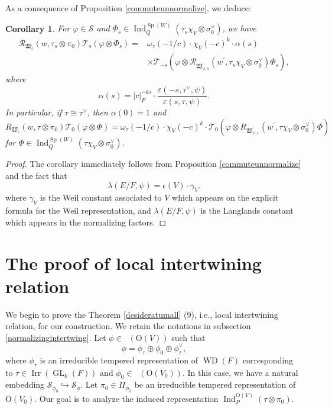 \documentclass[article]{article}
\numberwithin{equation}{section}
\newtheorem{corollary}[theorem]{Corollary}
\theoremstyle{definition}
\DeclareMathOperator{\WD}{WD}
\DeclareMathOperator{\Ind}{Ind}
\DeclareMathOperator{\GL}{GL}
\DeclareMathOperator{\SP}{Sp}
\DeclareMathOperator{\Irr}{Irr}
\DeclareMathOperator{\Para}{\Phi_{temp}}
\begin{document}
As a consequence of Proposition \ref{commuteunnormalize}, we deduce:
\begin{corollary}\label{123}
	For $\varphi\in \mathscr S $ and $\Phi_{s}\in \Ind_{Q}^{\SP(W)}(\tau_s\chi_{V}\otimes \sigma_{0}^{\vee})$, we have
	\begin{align*}
	\mathcal{R}_{\mathfrak W_{c}}\left(w, \tau_{s}\otimes \pi_0\right) \mathcal{T}_{s}\left(\varphi\otimes \Phi_{s}\right)=&\omega_{\tau}(-1/c)\cdot \chi_{V}(-c)^k\cdot  \alpha(s)\\
	&\times\mathcal{T}_{-s}\left(\varphi\otimes \mathcal{R}_{\mathfrak W^\prime_{\psi,1}}\left(w^{\prime}, \tau_{s}\chi_{V} \otimes \sigma_{0}^{\vee} \right)\Phi_{s}\right), 
	\end{align*}
	where
	$$
	\alpha(s)=|c|_{F}^{-ks} \cdot\frac{\varepsilon(-s,\tau^{\vee},\psi)}{\varepsilon(s,\tau,\psi)}.
	$$
	In particular, if $\tau\cong \tau^{\vee}$, then $\alpha(0)=1$ and 
$$
R_{\mathfrak W_{c}}\left(w, \tau\otimes \pi_0\right) \mathcal{T}_{0}\left(\varphi\otimes \Phi\right)=\omega_{\tau}(-1/c)\cdot \chi_{V}(-c)^k\cdot \mathcal{T}_{0}\left(\varphi\otimes R_{\mathfrak W^\prime_{\psi,1}}\left(w^{\prime}, \tau\chi_{V} \otimes \sigma_{0}^{\vee} \right)\Phi\right)
$$
for  $\Phi\in \Ind_{Q}^{\SP(W)}(\tau
\chi_{V}\otimes \sigma_{0}^{\vee})$. 
\end{corollary}
\begin{proof}
The corollary immediately follows from Proposition \ref{commuteunnormalize} and the fact that   
$$
\lambda(E/F,\psi)=\epsilon(V)\cdot \gamma_V.
$$
where $\gamma_V$ is the Weil constant associated to $V$ which appears on the explicit formula for the Weil representation, and $\lambda(E/F,\psi)$ is the Langlands constant which appears in the normalizing factors. 
\end{proof}



\section{The proof of local intertwining relation}
We begin to prove the Theorem \ref{desideratumall} (9), i.e., local intertwining relation, for our construction. We retain the notations in subsection \ref{normalizingintertwing}. Let $\phi\in \Para(\mathrm O(V))$ such that    
$$\phi=\phi_{\tau}\oplus\phi_0\oplus \phi_{\tau}^{\vee},$$
where $\phi_{\tau}$ is an irreducible tempered representation of $\WD(F)$ corresponding to $\tau\in \Irr(\GL_k(F))$ and $\phi_0\in \Para(\mathrm O(V_0))$. In this case, we have a natural embedding $\mathcal S_{\phi_0}\hookrightarrow \mathcal {S}_{\phi}$. Let $\pi_0\in \Pi_{\phi_0}$ be an irreducible tempered representation of $\mathrm O(V_0)$. Our goal is to analyze the induced representation $\Ind_{P}^{\mathrm O(V)}(\tau\otimes \pi_0)$. 
\end{document}
